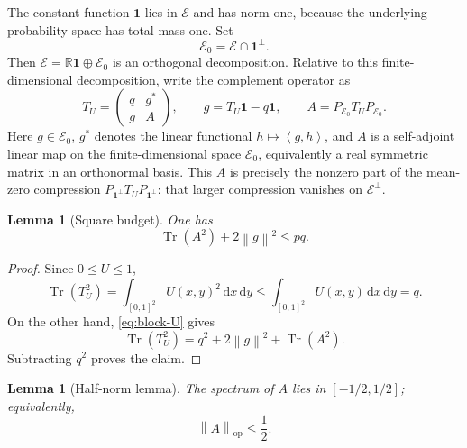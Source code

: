 \documentclass[11pt]{article}
\newtheorem{lemma}[theorem]{Lemma}
\newcommand{\one}{\mathbf 1}
\newcommand{\R}{\mathbb R}
\newcommand{\ip}[2]{\left\langle #1,#2\right\rangle}
\newcommand{\norm}[1]{\left\lVert #1\right\rVert}
\newcommand{\Tr}{\operatorname{Tr}}
\newcommand{\dd}{\,\mathrm d}
\begin{document}
The constant function \(\one\) lies in \(\mathcal E\) and has norm one,
because the underlying probability space has total mass one.  Set
\[
       \mathcal E_0=\mathcal E\cap\one^\perp.
\]
Then \(\mathcal E=\R\one\oplus\mathcal E_0\) is an orthogonal decomposition.
Relative to this finite-dimensional decomposition, write the complement
operator as
\begin{equation}\label{eq:block-U}
       T_U=
       \begin{pmatrix}
          q&g^*\\
          g&A
       \end{pmatrix},
       \qquad
       g=T_U\one-q\one,
       \qquad
       A=P_{\mathcal E_0}T_UP_{\mathcal E_0}.
\end{equation}
Here \(g\in\mathcal E_0\), \(g^*\) denotes the linear functional
\(h\mapsto\ip g h\), and \(A\) is a self-adjoint linear map on the
finite-dimensional space \(\mathcal E_0\), equivalently a real symmetric
matrix in an orthonormal basis.  This \(A\) is precisely the nonzero part of the
mean-zero compression \(P_{\one^\perp}T_UP_{\one^\perp}\): that larger
compression vanishes on \(\mathcal E^\perp\).

\begin{lemma}[Square budget]\label{lem:HS-budget}
One has
\begin{equation}\label{eq:HS-budget}
       \Tr(A^2)+2\norm g^2\le pq.
\end{equation}
\end{lemma}

\begin{proof}
Since \(0\le U\le1\),
\[
 \Tr(T_U^2)=\int_{[0,1]^2}U(x,y)^2\dd x\dd y
 \le\int_{[0,1]^2}U(x,y)\dd x\dd y=q.
\]
On the other hand, \eqref{eq:block-U} gives
\[
       \Tr(T_U^2)=q^2+2\norm g^2+\Tr(A^2).
\]
Subtracting \(q^2\) proves the claim.
\end{proof}

\begin{lemma}[Half-norm lemma]\label{lem:half-norm}
The spectrum of \(A\) lies in \([-1/2,1/2]\); equivalently,
\begin{equation}\label{eq:A-half}
       \norm A_{\mathrm{op}}\le\frac12.
\end{equation}
\end{lemma}
\end{document}
